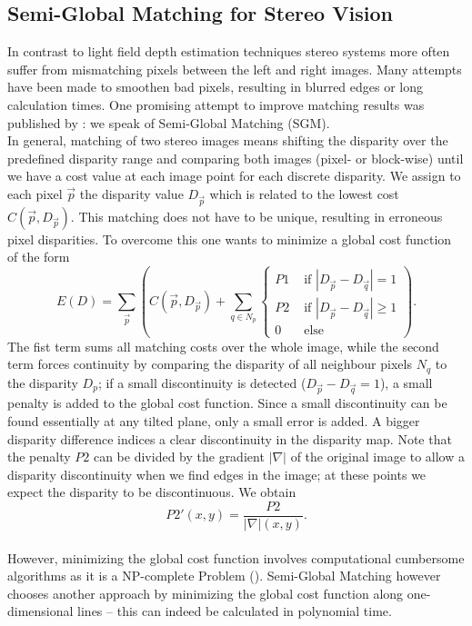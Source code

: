 \documentclass  [
  paper    = a4,
  BCOR     = 10mm,
  twoside,
  fontsize = 12pt,
  fleqn,
  toc      = bibnumbered,
  toc      = listofnumbered,
  numbers  = noendperiod,
  headings = normal,
  listof   = leveldown,
  version  = 3.03
]                                       {scrreprt}
\begin{document}
\subsection{Semi-Global Matching for Stereo Vision}
In contrast to light field depth estimation techniques stereo systems more often suffer from mismatching pixels between the left and right images. Many attempts have been made to smoothen bad pixels, resulting in blurred edges or long calculation times. One promising attempt to improve matching results was published by \cite{hirschmuller2005accurate}: we speak of Semi-Global Matching (SGM).\\
In general,  matching of two stereo images means shifting the disparity over the predefined disparity range and comparing both images (pixel- or block-wise) until we have a cost value at each image point for each discrete disparity. We assign to each pixel $\vec{p}$ the disparity value $D_{\vec p}$ which is related to the lowest cost $C(\vec{p}, D_{\vec p})$. This matching does not have to be unique, resulting in erroneous pixel disparities. 
To overcome this one wants to minimize a global cost function of the form 
\begin{equation}\label{eq:global_sgm}
E(D) = \sum_{\vec p} \left(C(\vec{p}, D_{\vec p}) + \sum_{q\in N_p} 
\begin{cases}
	P1 & \text{ if }|D_{\vec p} - D_{\vec q}| = 1\\
	P2 & \text{ if }|D_{\vec p} - D_{\vec q}| \geq 1\\
	0 & \text{ else }
	\end{cases}  
\right).
\end{equation}
The fist term sums all matching costs over the whole image, while the second term forces continuity by comparing the disparity of all neighbour pixels $N_q$ to the disparity $D_p$; if a  small discontinuity is detected ($D_{\vec p} - D_{\vec q} = 1$), a small penalty is added to the global cost function. Since a small discontinuity can be found essentially at any tilted plane, only a small error is added. A bigger disparity difference indices a clear discontinuity in the disparity map. Note that the penalty $P2$ can be divided by the gradient $|\nabla|$ of the original image to allow a disparity discontinuity when we find edges in the image; at these points we expect the disparity to be discontinuous. We obtain
\begin{equation}\label{key}
P2'(x,y) = \frac{P2}{|\nabla|(x,y)}.
\end{equation}\\ However, minimizing the global cost function involves computational cumbersome algorithms as it is a NP-complete Problem (\cite{hirschmuller2011semi}). Semi-Global Matching however chooses another approach by minimizing the global cost function along one-dimensional lines -- this can indeed be calculated in polynomial time.
\end{document}
